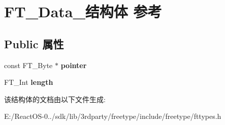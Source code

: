 \hypertarget{struct_f_t___data__}{}\section{F\+T\+\_\+\+Data\+\_\+结构体 参考}
\label{struct_f_t___data__}
\subsection*{Public 属性}
\begin{DoxyCompactItemize}
\item 
\mbox{\label{struct_f_t___data___a4dea731b8a256b973757e1b8f612b050}} 
const F\+T\+\_\+\+Byte $\ast$ {\bfseries pointer}
\item 
\mbox{\label{struct_f_t___data___af60c89dccd1852aceb0dc08675aca2fd}} 
F\+T\+\_\+\+Int {\bfseries length}
\end{DoxyCompactItemize}


该结构体的文档由以下文件生成\+:\begin{DoxyCompactItemize}
\item 
E\+:/\+React\+O\+S-\/0../sdk/lib/3rdparty/freetype/include/freetype/fttypes.\+h\end{DoxyCompactItemize}
